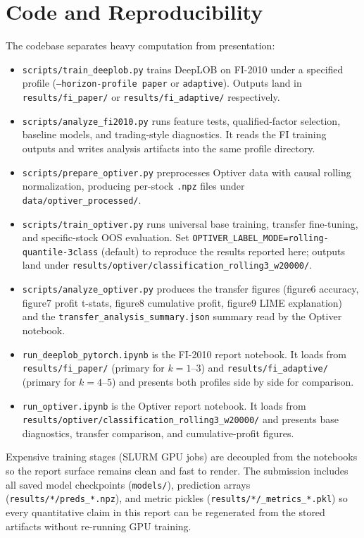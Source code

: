 \documentclass[11pt]{article}
\begin{document}
\section{Code and Reproducibility}
The codebase separates heavy computation from presentation:
\begin{itemize}[leftmargin=*]
    \item \texttt{scripts/train\_deeplob.py} trains DeepLOB on FI-2010 under a specified profile (\texttt{--horizon-profile paper} or \texttt{adaptive}). Outputs land in \texttt{results/fi\_paper/} or \texttt{results/fi\_adaptive/} respectively.
    \item \texttt{scripts/analyze\_fi2010.py} runs feature tests, qualified-factor selection, baseline models, and trading-style diagnostics. It reads the FI training outputs and writes analysis artifacts into the same profile directory.
    \item \texttt{scripts/prepare\_optiver.py} preprocesses Optiver data with causal rolling normalization, producing per-stock \texttt{.npz} files under \texttt{data/optiver\_processed/}.
    \item \texttt{scripts/train\_optiver.py} runs universal base training, transfer fine-tuning, and specific-stock OOS evaluation. Set \texttt{OPTIVER\_LABEL\_MODE=rolling-quantile-3class} (default) to reproduce the results reported here; outputs land under \texttt{results/optiver/classification\_rolling3\_w20000/}.
    \item \texttt{scripts/analyze\_optiver.py} produces the transfer figures (figure6 accuracy, figure7 profit t-stats, figure8 cumulative profit, figure9 LIME explanation) and the \texttt{transfer\_analysis\_summary.json} summary read by the Optiver notebook.
    \item \texttt{run\_deeplob\_pytorch.ipynb} is the FI-2010 report notebook. It loads from \texttt{results/fi\_paper/} (primary for $k{=}1$--$3$) and \texttt{results/fi\_adaptive/} (primary for $k{=}4$--$5$) and presents both profiles side by side for comparison.
    \item \texttt{run\_optiver.ipynb} is the Optiver report notebook. It loads from \texttt{results/optiver/classification\_rolling3\_w20000/} and presents base diagnostics, transfer comparison, and cumulative-profit figures.
\end{itemize}

Expensive training stages (SLURM GPU jobs) are decoupled from the notebooks so the report surface remains clean and fast to render. The submission includes all saved model checkpoints (\texttt{models/}), prediction arrays (\texttt{results/*/preds\_*.npz}), and metric pickles (\texttt{results/*/\*\_metrics\_*.pkl}) so every quantitative claim in this report can be regenerated from the stored artifacts without re-running GPU training.
\end{document}

